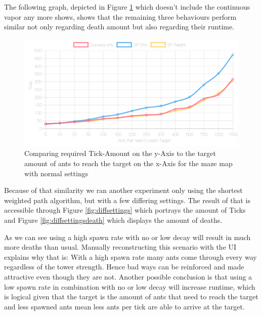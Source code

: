 The following graph, depicted in Figure \ref{fig:threesame} which doesn't include the continuous vapor any more shows, shows that the remaining three behaviours perform similar not only regarding death amount but also regarding their runtime.

\begin{figure}[H]
  \centering
  \includegraphics[width=1\linewidth]{images/normalsquaremaze-ticks-line}
  \caption{Comparing required Tick-Amount on the y-Axis to the target amount of ants to reach the target on the x-Axis for the maze map with normal settings}
  \label{fig:threesame}
\end{figure}

Because of that similarity we ran another experiment only using the shortest weighted path algorithm, but with a few differing settings. The result of that is accessible through Figure \ref{fig:diffsettings} which portrays the amount of Ticks and Figure \ref{fig:diffsettingsdeath} which displays the amount of deaths.

As we can see using a high spawn rate with no or low decay will result in much more deaths than usual. Manually reconstructing this scenario with the UI explains why that is: With a high spawn rate many ants come through every way regardless of the tower strength. Hence bad ways can be reinforced and made attractive even though they are not.
Another possible conclusion is that using a low spawn rate in combination with no or low decay will increase runtime, which is logical given that the target is the amount of ants that need to reach the target and less spawned ants mean less ants per tick are able to arrive at the target. 

